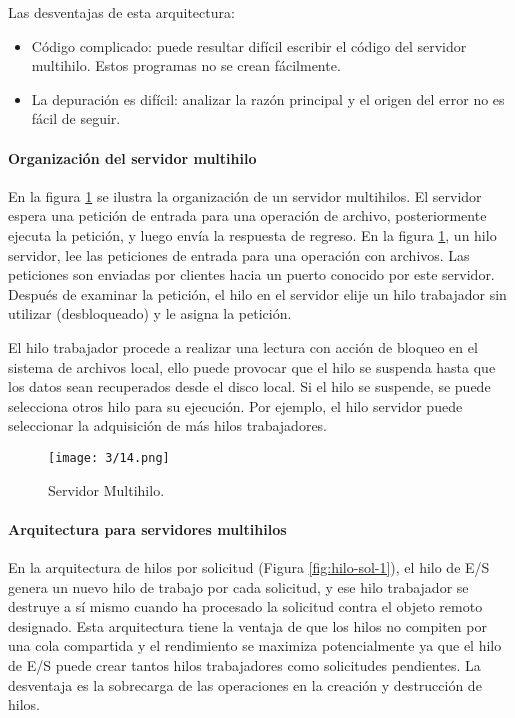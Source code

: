 	
		
	Las desventajas de esta arquitectura:
	\begin{itemize}
		\item Código complicado: puede resultar difícil escribir el código del servidor multihilo. Estos programas no se  crean fácilmente.
		\item La depuración es difícil: analizar la razón principal
			 y el origen del error no es fácil de seguir.
	\end{itemize}
 
 
 
	\paragraph{Organización del servidor multihilo }
	
 
En la figura \ref{fig:serv-multi} se ilustra la  organización de un servidor multihilos. El servidor  espera una petición de entrada para una operación de  archivo, posteriormente ejecuta la petición, y luego envía la respuesta de regreso. En la figura \ref{fig:serv-multi}, un hilo servidor, lee las peticiones  de entrada para una operación con archivos. Las peticiones son enviadas por clientes hacia  un puerto   conocido por este servidor. Después de examinar la petición, el hilo en el servidor elije  un hilo trabajador sin utilizar (desbloqueado) y le asigna la petición.
 
 El hilo trabajador procede a realizar una lectura con acción de bloqueo en el sistema de archivos local, ello puede  provocar que el hilo se suspenda hasta que los datos sean recuperados desde el disco local. Si el hilo  se suspende, se puede selecciona otros hilo para su ejecución. Por ejemplo, el hilo servidor puede seleccionar la adquisición de más hilos trabajadores. 
 
 
	
	 \begin{figure} %
		\texttt{[image: 3/14.png]}
		\caption{Servidor Multihilo. }
		\label{fig:serv-multi}
	\end{figure}

 
 \paragraph*{Arquitectura para servidores multihilos}
 En la arquitectura de hilos por solicitud (Figura \ref{fig:hilo-sol-1}), el hilo de E/S genera un nuevo hilo de trabajo por cada solicitud, y ese hilo trabajador se destruye a sí mismo cuando ha procesado la  solicitud contra el objeto remoto designado. Esta arquitectura tiene la ventaja de que  los hilos no compiten por una cola compartida y el rendimiento se maximiza potencialmente  ya que el hilo de E/S puede crear tantos hilos trabajadores como solicitudes pendientes.  La desventaja es la sobrecarga de las operaciones en la creación y destrucción de hilos.
 		 
